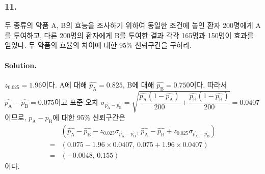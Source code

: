 \subsubsection{11.} 두 종류의 약품 A, B의 효능을 조사하기 위하여 동일한 조건에 놓인 환자 200명에게 A를 투여하고, 다른 200명의 환자에게 B를
투여한 결과 각각 165명과 150명이 효과를 얻었다. 두 약품의 효율의 차이에 대한 95\% 신뢰구간을 구하라.

\paragraph{Solution.} $z_{0.025}=1.96$이다. A에 대해 $\hat{p_\mathrm{A}}=0.825$, B에 대해 $\hat{p_\mathrm{B}}=0.750$이다. 따라서
$\hat{p_\mathrm{A}}-\hat{p_\mathrm{B}}=0.075$이고 표준 오차 $\sigma_{\hat{p_\mathrm{A}}-\hat{p_\mathrm{B}}}=
\sqrt{\dfrac{\hat{p_\mathrm{A}}\left(1-\hat{p_\mathrm{A}}\right)}{200}+
\dfrac{\hat{p_\mathrm{B}}\left(1-\hat{p_\mathrm{B}}\right)}{200}}=0.0407$이므로,
$p_\mathrm{A}-p_\mathrm{B}$에 대한 95\% 신뢰구간은
\begin{align*}
    & \left(\hat{p_\mathrm{A}}-\hat{p_\mathrm{B}}-z_{0.025}\sigma_{\hat{p_\mathrm{A}}-\hat{p_\mathrm{B}}},\,\hat{p_\mathrm{A}}-\hat{p_\mathrm{B}}+z_{0.025}\sigma_{\hat{p_\mathrm{A}}-\hat{p_\mathrm{B}}}\right) \\
   =& \left(0.075-1.96\times0.0407,\,0.075+1.96\times0.0407\right) \\
   =& \left(-0.0048,\,0.155\right)
\end{align*}
이다.